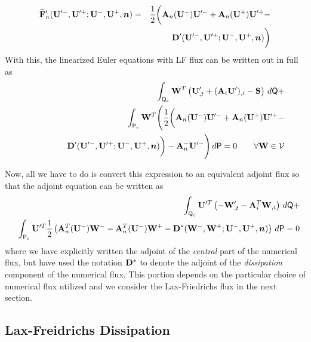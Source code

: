 \documentclass[12pt]{article}
\begin{document}
\begin{eqnarray}
{\widehat{{\bf F}}}'_n({{\bf U}}'^-,{{\bf U}}'^+;{{\bf U}}^-,{{\bf U}}^+,{\boldsymbol n}) &=& 
  \frac{1}{2} \biggl( {\bf A}_n({{\bf U}}^-){{\bf U}}'^- + {\bf A}_n({{\bf U}}^+){{\bf U}}'^+ - 
\nonumber\\ && \,\,\quad
  {\bf D}'({{\bf U}}'^-,{{\bf U}}'^+;{{\bf U}}^-,{{\bf U}}^+,{\boldsymbol n}) \biggr)
\end{eqnarray}
With this, the linearized Euler equations with LF flux can be written out in
full as
\begin{eqnarray}
&&\int_{{\sf Q}_e} {\bf W}^T \left({{\bf U}}'_{,t} + ({\bf A}_i{{\bf U}}')_{,i} - {\bf S} \right) \,d{\sf Q} +
\nonumber\\
&&\int_{{\sf P}_e} {\bf W}^T \Biggl( \frac{1}{2} \biggl( {\bf A}_n({{\bf U}}^-){{\bf U}}'^- + 
  {\bf A}_n({{\bf U}}^+){{\bf U}}'^+ - \nonumber\\ &&
  \qquad\qquad{\bf D}'({{\bf U}}'^-,{{\bf U}}'^+;{{\bf U}}^-,{{\bf U}}^+,{\boldsymbol n}) \biggr) - 
  {\bf A}^-_n{{\bf U}}'^- \Biggr) \,d{\sf P} = 0 \qquad \forall {\bf W} \in {\mathcal V} 
\end{eqnarray}

Now, all we have to do is convert this expression to an equivalent adjoint
flux so that the adjoint equation can be written as
\begin{eqnarray} \label{e:Euler_adjoint}
&&\int_{{\sf Q}_e} {{\bf U}}'^T \left(-{\bf W}'_{,t} - {\bf A}^T_i{\bf W}_{,i} \right) \,d{\sf Q} + 
\nonumber\\
&&\int_{{\sf P}_e} {{\bf U}}'^T \frac{1}{2}\left( {\bf A}^T_n({{\bf U}}^-) {\bf W}^- - 
                                        {\bf A}^T_n({{\bf U}}^-) {\bf W}^+ -
                               {\bf D}^*({\bf W}^-,{\bf W}^+;{{\bf U}}^-,{{\bf U}}^+,{\boldsymbol n}) \right) 
                               \,d{\sf P} = 0
\end{eqnarray}
where we have explicitly written the adjoint of the {\em central} part of the
numerical flux, but have used the notation ${\bf D}^*$ to denote the adjoint of
the {\em dissipation} component of the numerical flux.  This portion depends
on the particular choice of numerical flux utilized and we consider the
Lax-Friedrichs flux in the next section.

\subsection{Lax-Freidrichs Dissipation}
\end{document}
